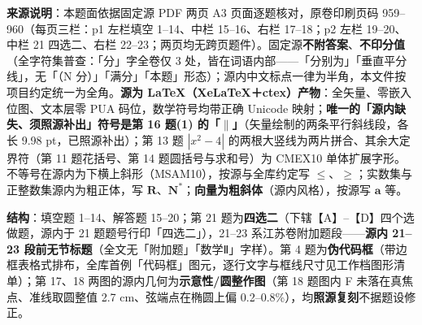 


\begin{gktip}
\textbf{来源说明}：本题面依据固定源 PDF 两页 A3 页面逐题核对，原卷印刷页码 959–960（每页三栏：p1 左栏填空 1–14、中栏 15–16、右栏 17–18；p2 左栏 19–20、中栏 21 四选二、右栏 22–23；两页均无跨页题件）。固定源\textbf{不附答案}、\textbf{不印分值}（全字符集普查：「分」字全卷仅 3 处，皆在词语内部——「分别为」「垂直平分线」，无「（N 分）」「满分」「本题」形态）；源内中文标点一律为半角，本文件按项目约定统一为全角。\textbf{源为 LaTeX（XeLaTeX＋ctex）产物}：全矢量、零嵌入位图、文本层零 PUA 码位，数学符号均带正确 Unicode 映射；\textbf{唯一的「源内缺失、须照源补出」符号是第 16 题(1) 的「$\parallel$」}（矢量绘制的两条平行斜线段，各长 9.98 pt，已照源补出）；第 13 题 \(|x^{2}-4|\) 的两根大竖线为两片拼合、其余大定界符（第 11 题花括号、第 14 题圆括号与求和号）为 CMEX10 单体扩展字形。不等号在源内为下横上斜形（MSAM10），按源与全库约定写 \(\leqslant\)、\(\geqslant\)；实数集与正整数集源内为粗正体，写 \(\mathbf{R}\)、\(\mathbf{N}^{*}\)；\textbf{向量为粗斜体}（源内风格），按源写 \(\boldsymbol a\) 等。

\textbf{结构}：填空题 1–14、解答题 15–20；第 21 题为\textbf{四选二}（下辖【A】–【D】四个选做题，源内于 21 题题号行印「四选二」），21–23 系江苏卷附加题段——\textbf{源内 21–23 段前无节标题}（全文无「附加题」「数学Ⅱ」字样）。第 4 题为\textbf{伪代码框}（带边框表格式排布，全库首例「代码框」图元，逐行文字与框线尺寸见工作档图形清单）；第 17、18 两图的源内几何为\textbf{示意性/圆整作图}（第 18 题图内 F 未落在真焦点、准线取圆整值 2.7 cm、弦端点在椭圆上偏 0.2–0.8\%），均\textbf{照源复刻}不据题设修正。
\end{gktip}


